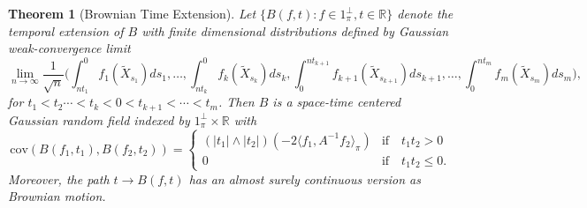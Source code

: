 \documentclass[10pt,a4paper]{amsart}
\newtheorem{thm}{Theorem}
\begin{document}
\begin{thm}[Brownian Time Extension]\label{extendtime}
Let $\{B(f,t):f\in 1_\pi^\perp, t\in\mathbb{R}\}$ denote the
temporal extension of $B$ with finite dimensional
distributions defined by Gaussian weak-convergence limit 
\begin{equation}
\lim_{n\to\infty}\frac{1}{\sqrt{n}}\bigg(\int_{nt_1}^0f_1(\tilde{X}_{s_1})ds_1,\dots,\int_{nt_k}^0f_k(\tilde{X}_{s_k})ds_k,
 \int_{0}^{nt_{k+1}}f_{k+1}(\tilde{X}_{s_{k+1}})ds_{k+1},\dots,\int_0^{nt_m}f_m(\tilde{X}_{s_m})ds_m\bigg),
\end{equation}
for $t_1<t_2\cdots<t_k<0<t_{k+1}<\cdots< t_m$.
 Then ${B}$ is a space-time
centered 
Gaussian random field indexed by $1_\pi^\perp\times\mathbb{R}$
with 
 \begin{equation}
 \text{cov}(B(f_1,t_1),B(f_2,t_2))
 =
 \begin{cases} (|t_1|\wedge|t_2|)(-2\langle f_1, A^{-1}f_2\rangle_\pi)
 & \text{if}\quad t_1t_2 >0\\
 0 & \text{if}\quad t_1t_2\le 0.
 \end{cases}
 \end{equation}
 Moreover, 
 the path $t\to B(f,t)$ has an
 almost surely continuous version as  Brownian motion.
\end{thm}
\end{document}
